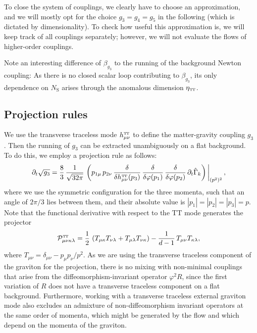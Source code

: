 \documentclass[11pt]{book}
\newcommand\TTspace{ -1pt }
\newcommand\TT{ \scriptscriptstyle{\mathrm{T\hspace{\TTspace}T}} }
\newcommand\hTTmunu{ h^{\scriptscriptstyle{\mathrm{T\hspace{\TTspace}T}}}_{\mu\nu} }
\newcommand\etaTT{ \eta_{\scriptscriptstyle{\mathrm{T\hspace{\TTspace}T}}} }
\newcommand\NS{ N_{\scriptscriptstyle{\mathrm{S}}} }
\numberwithin{equation}{chapter}
\begin{document}
To close the system of couplings, we clearly have to choose an approximation,
and we will mostly opt for the choice $g_3=g_4=g_5$ in the following
(which is dictated by dimensionality). To check how useful this approximation is,
we will keep track of all couplings separately;
however, we will not evaluate the flows of higher-order couplings.

Note an interesting difference of $\beta_{g_3}$ to the running of the background Newton coupling:
As there is no closed scalar loop contributing to $\beta_{g_3}$,
its only dependence on $\NS$ arises through the anomalous dimension $\etaTT$.


\subsection{Projection rules}

We use the transverse traceless mode $\hTTmunu$
to define the matter-gravity coupling $g_3$.
Then the running of $g_3$ can be extracted unambiguously on a flat background.
To do this, we employ a projection rule as follows:
\begin{align}
  \partial_t \sqrt{g_3} = \frac{8}{3} \, \frac{1}{\sqrt{32 \pi}} \,
  \left(
    p_{1\mu} \, p_{2\nu}  \,
    \frac{\delta}{\delta \hTTmunu(p_3)} \, \frac{\delta}{\delta\varphi(p_1)} \, \frac{\delta}{\delta\varphi(p_2)} \,
    \partial_t \hat \Gamma_k
  \right) \bigg|_{(p^2)^2} \,,
  \label{projectiong3}
\end{align}
where we use the symmetric configuration for the three momenta,
such that an angle of $2\pi/3$ lies between them, and their absolute value is $|p_1| = |p_2|=|p_3| =p$.
Note that the functional derivative with respect to the $\mathrm{TT}$ mode generates the projector
\begin{align}
  \mathcal{P}^{\TT}_{\mu\nu\kappa\lambda} = \frac{1}{2} \,
  \left(
    T_{\mu
    \kappa}T_{\nu \lambda}
    + T_{\mu\lambda}T_{\nu \kappa}
  \right)
  - \frac{1}{d-1} \, T_{\mu\nu}T_{\kappa\lambda},
  \label{projector}
\end{align}
where $T_{\mu \nu}=\delta_{\mu\nu}-p_{\mu}p_{\nu}/p^2$.
As we are using the transverse traceless component of the graviton for the projection,
there is no mixing with non-minimal couplings that arise from the diffeomorphism-invariant
operator $\varphi^2 R$, since the first variation of $R$ does not have a transverse traceless
component  on a flat background.
Furthermore, working with a transverse traceless external graviton mode also excludes an admixture
of non-diffeomorphism invariant operators at the same order of momenta,
which might be generated by the flow and which depend on the momenta of the graviton.
\end{document}
